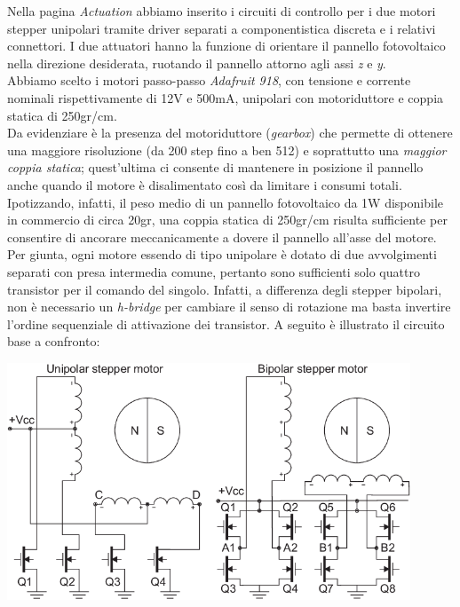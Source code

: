 \noindent Nella pagina \emph{Actuation} abbiamo inserito i circuiti di controllo per 
i due motori stepper unipolari tramite driver separati a
componentistica discreta e i relativi connettori. I due attuatori hanno
la funzione di orientare il pannello fotovoltaico nella direzione
desiderata, ruotando il pannello attorno agli assi \emph{z} e \emph{y}.\\
Abbiamo scelto i motori passo-passo \emph{Adafruit 918}, con tensione e
corrente nominali rispettivamente di 12V e 500mA, unipolari con
motoriduttore e coppia statica di 250gr/cm.\\
Da evidenziare è la presenza del motoriduttore (\emph{gearbox}) che
permette di ottenere una maggiore risoluzione (da 200 step fino a ben
512) e soprattutto una \emph{maggior coppia statica}; quest'ultima ci
consente di mantenere in posizione il pannello anche quando il motore è
disalimentato così da limitare i consumi totali. Ipotizzando, infatti,
il peso medio di un pannello fotovoltaico da 1W disponibile in commercio
di circa 20gr, una coppia statica di 250gr/cm risulta sufficiente per
consentire di ancorare meccanicamente a dovere il pannello all'asse del
motore.\\
Per giunta, ogni motore essendo di tipo unipolare è dotato di due
avvolgimenti separati con presa intermedia comune, pertanto sono
sufficienti solo quattro transistor per il comando del singolo. Infatti,
a differenza degli stepper bipolari, non è necessario un \emph{h-bridge}
per cambiare il senso di rotazione ma basta invertire l'ordine
sequenziale di attivazione dei transistor. A seguito è illustrato il
circuito base a confronto:

\begin{center}
\includegraphics[width=0.9\textwidth]{figures/image75.png}
\captionsetup{type=figure}
\end{center}

